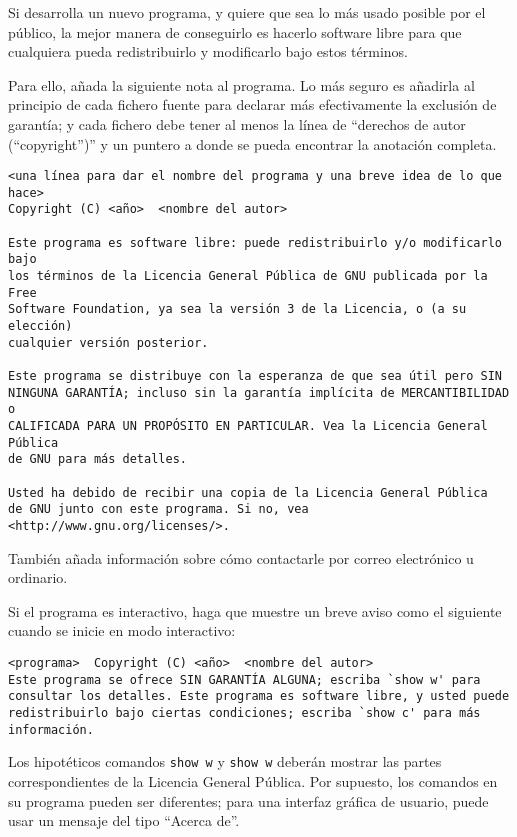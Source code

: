 \documentclass[11pt]{article}
\begin{document}
\begin{enumerate}
Si desarrolla un nuevo programa, y quiere que sea lo m\'{a}s usado posible por
el p\'{u}blico, la mejor manera de conseguirlo es hacerlo software libre para que
cualquiera pueda redistribuirlo y modificarlo bajo estos t\'{e}rminos.

Para ello, a\~nada la siguiente nota al programa. Lo m\'{a}s seguro es a\~nadirla
al principio de cada fichero fuente para declarar m\'{a}s efectivamente la
exclusi\'{o}n de garant\'{i}a; y cada fichero debe tener al menos la l\'{i}nea de ``derechos de autor (``copyright'')''
y un puntero a donde se pueda encontrar la anotaci\'{o}n completa.

{\footnotesize
\begin{verbatim}
<una línea para dar el nombre del programa y una breve idea de lo que hace>
Copyright (C) <año>  <nombre del autor>
    
Este programa es software libre: puede redistribuirlo y/o modificarlo bajo
los términos de la Licencia General Pública de GNU publicada por la Free
Software Foundation, ya sea la versión 3 de la Licencia, o (a su elección)
cualquier versión posterior.
    
Este programa se distribuye con la esperanza de que sea útil pero SIN
NINGUNA GARANTÍA; incluso sin la garantía implícita de MERCANTIBILIDAD o
CALIFICADA PARA UN PROPÓSITO EN PARTICULAR. Vea la Licencia General Pública 
de GNU para más detalles.
    
Usted ha debido de recibir una copia de la Licencia General Pública 
de GNU junto con este programa. Si no, vea <http://www.gnu.org/licenses/>.
\end{verbatim}
}

Tambi\'{e}n a\~nada informaci\'{o}n sobre c\'{o}mo contactarle por correo electr\'{o}nico u
ordinario.

Si el programa es interactivo, haga que muestre un breve aviso como el 
siguiente cuando se inicie en modo interactivo:

{\footnotesize
\begin{verbatim}
<programa>  Copyright (C) <año>  <nombre del autor>
Este programa se ofrece SIN GARANTÍA ALGUNA; escriba `show w' para 
consultar los detalles. Este programa es software libre, y usted puede 
redistribuirlo bajo ciertas condiciones; escriba `show c' para más 
información.
\end{verbatim}
}

Los hipot\'{e}ticos comandos {\tt show w} y {\tt show w} deber\'{a}n mostrar las partes 
correspondientes de la Licencia General P\'{u}blica. Por supuesto, los comandos 
en su programa pueden ser diferentes; para una interfaz gr\'{a}fica de usuario, 
puede usar un mensaje del tipo ``Acerca de''.


\end{enumerate}
\end{document}

